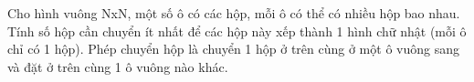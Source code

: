 Cho hình vuông NxN, một số ô có các hộp, mỗi ô có thể có nhiều hộp bao nhau. Tính số hộp cần chuyển ít nhất để các hộp này xếp thành 1 hình chữ nhật (mỗi ô chỉ có 1 hộp). Phép chuyển hộp là chuyển 1 hộp ở trên cùng ở một ô vuông sang và đặt ở trên cùng 1 ô vuông nào khác.  



\